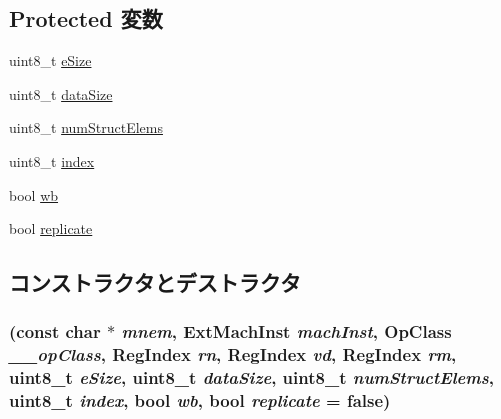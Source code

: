 \subsection*{Protected 変数}
\begin{DoxyCompactItemize}
\item 
uint8\_\-t \hyperlink{classArmISA_1_1VstSingleOp64_aac129ded07ba57383c5e2540f22c94ef}{eSize}
\item 
uint8\_\-t \hyperlink{classArmISA_1_1VstSingleOp64_af13e629a2f79d14821c7b9246ef99e9f}{dataSize}
\item 
uint8\_\-t \hyperlink{classArmISA_1_1VstSingleOp64_afb0be420b537599a5b86558127502040}{numStructElems}
\item 
uint8\_\-t \hyperlink{classArmISA_1_1VstSingleOp64_aae5a12e607d0f782506d9e6ec6179c64}{index}
\item 
bool \hyperlink{classArmISA_1_1VstSingleOp64_a93541ed16711b2c9c53cf093b675d90b}{wb}
\item 
bool \hyperlink{classArmISA_1_1VstSingleOp64_a8f2b56ecc4db4f48e2c08aef78591efc}{replicate}
\end{DoxyCompactItemize}


\subsection{コンストラクタとデストラクタ}
\hypertarget{classArmISA_1_1VstSingleOp64_a009a820bb99cfc9faf08044c53c9c928}{
\subsubsection[{VstSingleOp64}]{ (const char $\ast$ {\em mnem}, \/  {\bf ExtMachInst} {\em machInst}, \/  OpClass {\em \_\-\_\-opClass}, \/  {\bf RegIndex} {\em rn}, \/  {\bf RegIndex} {\em vd}, \/  {\bf RegIndex} {\em rm}, \/  uint8\_\-t {\em eSize}, \/  uint8\_\-t {\em dataSize}, \/  uint8\_\-t {\em numStructElems}, \/  uint8\_\-t {\em index}, \/  bool {\em wb}, \/  bool {\em replicate} = {\ttfamily false})}}
\label{classArmISA_1_1VstSingleOp64_a009a820bb99cfc9faf08044c53c9c928}




